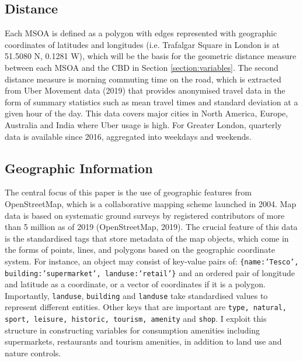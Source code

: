 \documentclass{article}
\begin{document}
\subsection{Distance}
Each MSOA is defined as a polygon with edges represented with geographic coordinates of latitudes and longitudes (i.e. Trafalgar Square in London is at 51.5080 N, 0.1281 W), which will be the basis for the geometric distance measure between each MSOA and the CBD in Section \ref{section:variables}. The second distance measure is morning commuting time on the road, which is extracted from Uber Movement data (2019) that provides anonymised travel data in the form of summary statistics such as mean travel times and standard deviation at a given hour of the day. This data covers major cities in North America, Europe, Australia and India where Uber usage is high. For Greater London, quarterly data is available since 2016, aggregated into weekdays and weekends.

\subsection{Geographic Information}
The central focus of this paper is the use of geographic features from OpenStreetMap, which is a collaborative mapping scheme launched in 2004. Map data is based on systematic ground surveys by registered contributors of more than 5 million as of 2019 (OpenStreetMap, 2019). The crucial feature of this data is the standardised tags that store metadata of the map objects, which come in the forms of points, lines, and polygons based on the geographic coordinate system. For instance, an object may consist of key-value pairs of:  \texttt{\{name:'Tesco', building:'supermarket', landuse:'retail'\}} and an ordered pair of longitude and latitude as a coordinate, or a vector of coordinates if it is a polygon. Importantly, \texttt{landuse}, \texttt{building} and \texttt{landuse} take standardised values to represent different entities. Other keys that are important are \texttt{type, natural, sport, leisure, historic, tourism, amenity} and \texttt{shop}. I exploit this structure in constructing variables for consumption amenities including supermarkets, restaurants and tourism amenities, in addition to land use and nature controls.
\end{document}

